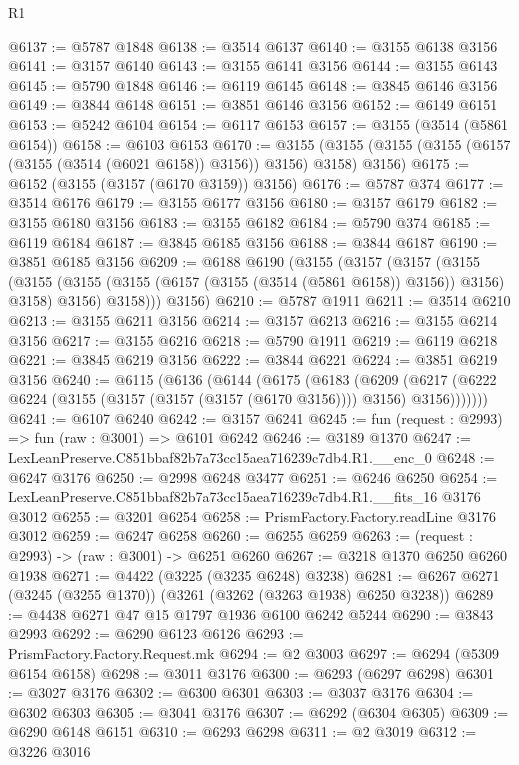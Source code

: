 \begin{lexlean}{R1}
\begin{coremodule}
@6137 := @5787 @1848
@6138 := @3514 @6137
@6140 := @3155 @6138 @3156
@6141 := @3157 @6140
@6143 := @3155 @6141 @3156
@6144 := @3155 @6143
@6145 := @5790 @1848
@6146 := @6119 @6145
@6148 := @3845 @6146 @3156
@6149 := @3844 @6148
@6151 := @3851 @6146 @3156
@6152 := @6149 @6151
@6153 := @5242 @6104
@6154 := @6117 @6153
@6157 := @3155 (@3514 (@5861 @6154))
@6158 := @6103 @6153
@6170 := @3155 (@3155 (@3155 (@3155 (@6157 (@3155 (@3514 (@6021 @6158)) @3156)) @3156) @3158) @3156)
@6175 := @6152 (@3155 (@3157 (@6170 @3159)) @3156)
@6176 := @5787 @374
@6177 := @3514 @6176
@6179 := @3155 @6177 @3156
@6180 := @3157 @6179
@6182 := @3155 @6180 @3156
@6183 := @3155 @6182
@6184 := @5790 @374
@6185 := @6119 @6184
@6187 := @3845 @6185 @3156
@6188 := @3844 @6187
@6190 := @3851 @6185 @3156
@6209 := @6188
    @6190
    (@3155
      (@3157
        (@3157
          (@3155
            (@3155 (@3155 (@3155 (@6157 (@3155 (@3514 (@5861 @6158)) @3156)) @3156) @3158) @3156)
            @3158)))
      @3156)
@6210 := @5787 @1911
@6211 := @3514 @6210
@6213 := @3155 @6211 @3156
@6214 := @3157 @6213
@6216 := @3155 @6214 @3156
@6217 := @3155 @6216
@6218 := @5790 @1911
@6219 := @6119 @6218
@6221 := @3845 @6219 @3156
@6222 := @3844 @6221
@6224 := @3851 @6219 @3156
@6240 := @6115
    (@6136
      (@6144
        (@6175
          (@6183
            (@6209
              (@6217 (@6222 @6224 (@3155 (@3157 (@3157 (@3157 (@6170 @3156)))) @3156) @3156)))))))
@6241 := @6107 @6240
@6242 := @3157 @6241
@6245 := fun (request : @2993) => fun (raw : @3001) => @6101 @6242
@6246 := @3189 @1370
@6247 := LexLeanPreserve.C851bbaf82b7a73cc15aea716239c7db4.R1.__enc_0
@6248 := @6247 @3176
@6250 := @2998 @6248 @3477
@6251 := @6246 @6250
@6254 := LexLeanPreserve.C851bbaf82b7a73cc15aea716239c7db4.R1.__fits_16 @3176 @3012
@6255 := @3201 @6254
@6258 := PrismFactory.Factory.readLine @3176 @3012
@6259 := @6247 @6258
@6260 := @6255 @6259
@6263 := (request : @2993) -> (raw : @3001) -> @6251 @6260
@6267 := @3218 @1370 @6250 @6260 @1938
@6271 := @4422 (@3225 (@3235 @6248) @3238)
@6281 := @6267 @6271 (@3245 (@3255 @1370)) (@3261 (@3262 (@3263 @1938) @6250 @3238))
@6289 := @4438 @6271 @47 @15 @1797 @1936 @6100 @6242 @5244
@6290 := @3843 @2993
@6292 := @6290 @6123 @6126
@6293 := PrismFactory.Factory.Request.mk
@6294 := @2 @3003
@6297 := @6294 (@5309 @6154 @6158)
@6298 := @3011 @3176
@6300 := @6293 (@6297 @6298)
@6301 := @3027 @3176
@6302 := @6300 @6301
@6303 := @3037 @3176
@6304 := @6302 @6303
@6305 := @3041 @3176
@6307 := @6292 (@6304 @6305)
@6309 := @6290 @6148 @6151
@6310 := @6293 @6298
@6311 := @2 @3019
@6312 := @3226 @3016

\end{coremodule}
\end{lexlean}
